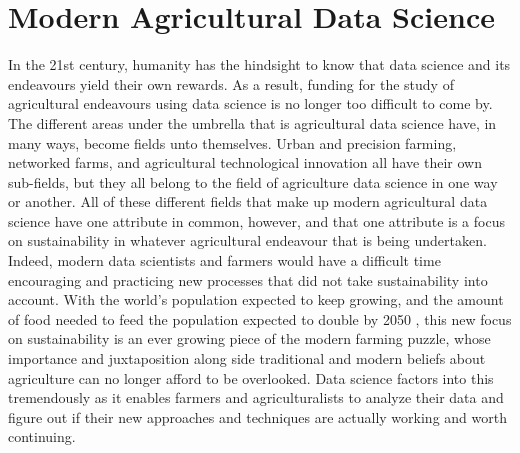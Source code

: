 \documentclass[sigconf]{acmart}
\begin{document}
\section{Modern Agricultural Data Science}

In the 21st century, humanity has the hindsight to know that data science and its endeavours yield their own rewards. As a result, funding for the study of agricultural endeavours using data science is no longer too difficult to come by. The different areas under the umbrella that is agricultural data science have, in many ways, become fields unto themselves. Urban and precision farming, networked farms, and agricultural technological innovation all have their own sub-fields, but they all belong to the field of agriculture data science in one way or another. All of these different fields that make up modern agricultural data science have one attribute in common, however, and that one attribute is a focus on sustainability in whatever agricultural endeavour that is being undertaken. Indeed, modern data scientists and farmers would have a difficult time encouraging and practicing new processes that did not take sustainability into account. With the world's population expected to keep growing, and the amount of food needed to feed the population expected to double by 2050 \cite{green2005}, this new focus on sustainability is an ever growing piece of the modern farming puzzle, whose importance and juxtaposition along side traditional and modern beliefs about agriculture can no longer afford to be overlooked. Data science factors into this tremendously as it enables farmers and agriculturalists to analyze their data and figure out if their new approaches and techniques are actually working and worth continuing.
\end{document}
